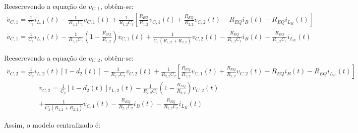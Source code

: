 Reescrevendo a equação de $v_{C,1}$, obtêm-se:
\begin{gather*}
  \dot{v}_{C,1} = \frac{1}{C_1} i_{L,1}(t) - \frac{1}{R_{1,2}C_1} v_{C,1}(t) + \frac{1}{R_{1,2} C_1} \left[\frac{R_{EQ}}{R_{1,2}} v_{C,1}(t) + \frac{R_{EQ}}{R_{2,2}} v_{C,2}(t) - R_{EQ} i_B(t) - R_{EQ} i_{L_K}(t)\right]
\end{gather*}
\begin{gather}
  \dot{v}_{C,1} = \frac{1}{C_1} i_{L,1}(t) - \frac{1}{R_{1,2}C_1} \left(1  - \frac{R_{EQ}}{R_{1,2}}\right) v_{C,1}(t) +\frac{1}{C_1 (R_{1,2} + R_{2,2})} v_{C,2}(t) - \frac{R_{EQ}}{R_{1,2}C_1} i_B(t) - \frac{R_{EQ}}{R_{1,2}C_1} i_{L_K}(t)
\end{gather}

Reescrevendo a equação de $v_{C,2}$, obtêm-se:
\begin{gather*}
  \dot{v}_{C,2} = \frac{1}{C_2} i_{L,2}(t) \left[1 - d_2(t)\right] - \frac{1}{R_{2,2} C_2} v_{C,2}(t) + \frac{1}{R_{2,2} C_2} \left[\frac{R_{EQ}}{R_{1,2}} v_{C,1}(t) + \frac{R_{EQ}}{R_{2,2}} v_{C,2}(t) - R_{EQ} i_B(t) - R_{EQ} i_{L_K}(t)\right]
\end{gather*}
\begin{multline}
  \dot{v}_{C,2} = \frac{1}{C_2} \left[1 - d_2(t)\right] i_{L,2}(t)
  - \frac{1}{R_{2,2} C_2} \left(1 - \frac{R_{EQ}}{R_{2,2}}\right) v_{C,2}(t)\\
  + \frac{1}{C_2 (R_{1,2} + R_{2,2})} v_{C,1}(t)
  - \frac{R_{EQ}}{R_{2,2}C_2} i_B(t) - \frac{R_{EQ}}{R_{2,2}C_2} i_{L_K}(t)
\end{multline}

Assim, o modelo centralizado é:

